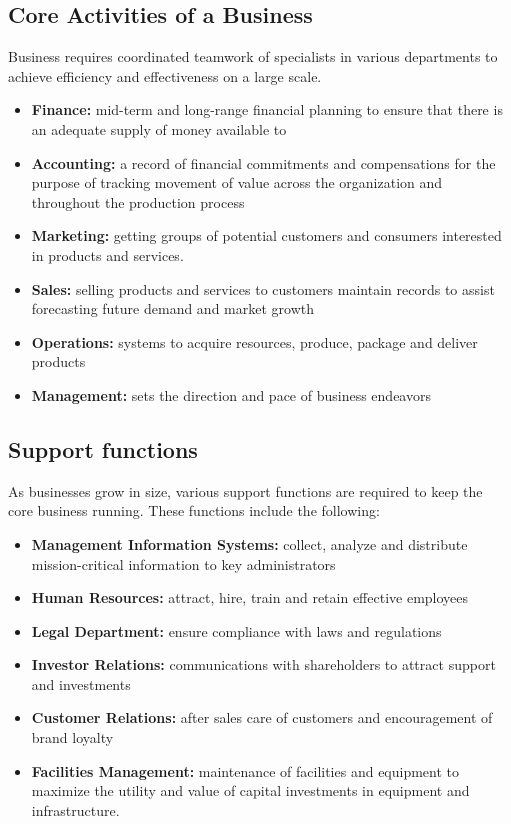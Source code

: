 \documentclass[]{book}
\providecommand{\tightlist}{%
  \setlength{\itemsep}{0pt}\setlength{\parskip}{0pt}}
\begin{document}
\hypertarget{core-activities-of-a-business}{%
\subsection{Core Activities of a Business}\label{core-activities-of-a-business}}

Business requires coordinated teamwork of specialists in various departments to achieve efficiency and effectiveness on a large scale.

\begin{itemize}
\tightlist
\item
  \textbf{Finance:} mid-term and long-range financial planning to ensure that there is an adequate supply of money available to
\item
  \textbf{Accounting:} a record of financial commitments and compensations for the purpose of tracking movement of value across the organization and throughout the production process
\item
  \textbf{Marketing:} getting groups of potential customers and consumers interested in products and services.
\item
  \textbf{Sales:} selling products and services to customers maintain records to assist forecasting future demand and market growth
\item
  \textbf{Operations:} systems to acquire resources, produce, package and deliver products
\item
  \textbf{Management:} sets the direction and pace of business endeavors
\end{itemize}

\hypertarget{support-functions}{%
\subsection{Support functions}\label{support-functions}}

As businesses grow in size, various support functions are required to keep the core business running. These functions include the following:

\begin{itemize}
\tightlist
\item
  \textbf{Management Information Systems:} collect, analyze and distribute mission-critical information to key administrators
\item
  \textbf{Human Resources:} attract, hire, train and retain effective employees
\item
  \textbf{Legal Department:} ensure compliance with laws and regulations
\item
  \textbf{Investor Relations:} communications with shareholders to attract support and investments
\item
  \textbf{Customer Relations:} after sales care of customers and encouragement of brand loyalty
\item
  \textbf{Facilities Management:} maintenance of facilities and equipment to maximize the utility and value of capital investments in equipment and infrastructure.
\end{itemize}
\end{document}
